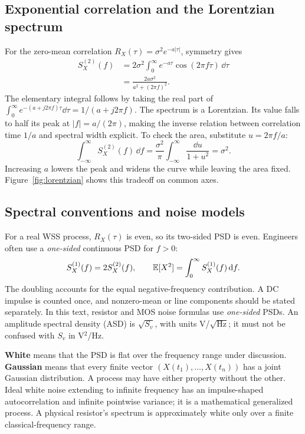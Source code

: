 \subsection{Exponential correlation and the Lorentzian spectrum}\label{sec:lorentzian}
For the zero-mean correlation $R_X(\tau)=\sigma^2e^{-a|\tau|}$, symmetry gives
\begin{align}
S_X^{(2)}(f)
&=2\sigma^2\int_0^\infty e^{-a\tau}\cos(2\pi f\tau)\,\dd\tau\\
&=\boxed{\frac{2a\sigma^2}{a^2+(2\pi f)^2}}.\label{eq:lorentzian}
\end{align}
The elementary integral follows by taking the real part of $\int_0^\infty e^{-(a+j2\pi f)\tau}\dd\tau=1/(a+j2\pi f)$. The spectrum is a Lorentzian. Its value falls to half its peak at $|f|=a/(2\pi)$, making the inverse relation between correlation time $1/a$ and spectral width explicit. To check the area, substitute $u=2\pi f/a$:
\[
\int_{-\infty}^{\infty}S_X^{(2)}(f)\,\dd f
=\frac{\sigma^2}{\pi}\int_{-\infty}^{\infty}\frac{\dd u}{1+u^2}
=\sigma^2.
\]
Increasing $a$ lowers the peak and widens the curve while leaving the area fixed. Figure~\ref{fig:lorentzian} shows this tradeoff on common axes.
\CorrelationSpectrumFigure

\subsection{Spectral conventions and noise models}
For a real WSS process, $R_X(\tau)$ is even, so its two-sided PSD is even. Engineers often use a \emph{one-sided} continuous PSD for $f>0$:
\begin{equation}
S_X^{(1)}(f)=2S_X^{(2)}(f),\qquad
\mathbb E[X^2]=\int_0^\infty S_X^{(1)}(f)\,\mathrm d f.\label{eq:onesided}
\end{equation}
The doubling accounts for the equal negative-frequency contribution. A DC impulse is counted once, and nonzero-mean or line components should be stated separately. In this text, resistor and MOS noise formulas use \emph{one-sided} PSDs. An amplitude spectral density (ASD) is $\sqrt{S_v}$, with units V/$\sqrt{\mathrm{Hz}}$; it must not be confused with $S_v$ in V$^2$/Hz.

\begin{concept}[title={Whiteness and Gaussianity}]
\textbf{White} means that the PSD is flat over the frequency range under discussion. \textbf{Gaussian} means that every finite vector $(X(t_1),\ldots,X(t_n))$ has a joint Gaussian distribution. A process may have either property without the other. Ideal white noise extending to infinite frequency has an impulse-shaped autocorrelation and infinite pointwise variance; it is a mathematical generalized process. A physical resistor's spectrum is approximately white only over a finite classical-frequency range.
\end{concept}

